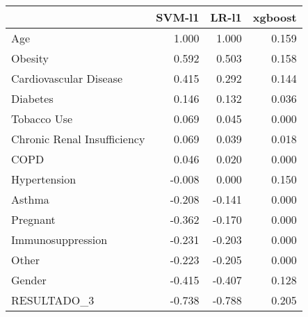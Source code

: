 \begin{tabular}{lrrr}
\toprule
{} &  SVM-l1 &  LR-l1 &  xgboost \\
\midrule
Age                         &   1.000 &  1.000 &    0.159 \\
Obesity                     &   0.592 &  0.503 &    0.158 \\
Cardiovascular Disease      &   0.415 &  0.292 &    0.144 \\
Diabetes                    &   0.146 &  0.132 &    0.036 \\
Tobacco Use                 &   0.069 &  0.045 &    0.000 \\
Chronic Renal Insufficiency &   0.069 &  0.039 &    0.018 \\
COPD                        &   0.046 &  0.020 &    0.000 \\
Hypertension                &  -0.008 &  0.000 &    0.150 \\
Asthma                      &  -0.208 & -0.141 &    0.000 \\
Pregnant                    &  -0.362 & -0.170 &    0.000 \\
Immunosuppression           &  -0.231 & -0.203 &    0.000 \\
Other                       &  -0.223 & -0.205 &    0.000 \\
Gender                      &  -0.415 & -0.407 &    0.128 \\
RESULTADO\_3                 &  -0.738 & -0.788 &    0.205 \\
\bottomrule
\end{tabular}
